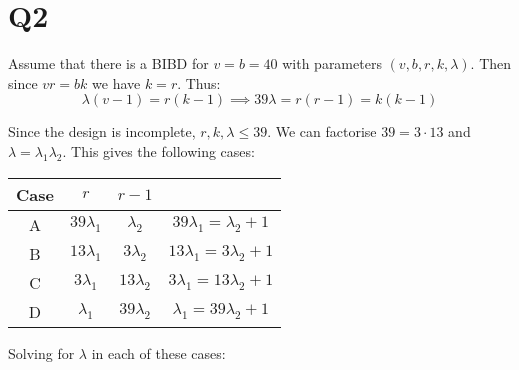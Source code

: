 \documentclass[a4paper, 11pt]{article}
\begin{document}
\pagebreak
\section*{Q2}
 Assume that there is a BIBD for $v=b=40$ with parameters $(v,b,r,k,\lambda)$. Then since $vr=bk$ we have $k=r$. Thus: 
\[
	\lambda(v-1) = r(k-1) \implies 39\lambda = r(r-1) = k(k-1)
\]

Since the design is incomplete, $r,k,\lambda\leq39$. We can factorise $39=3\cdot 13$ and $\lambda=\lambda_1\lambda_2$. This gives the following cases: 

\begin{center}
	\begin{tabular}{c|cc|c}
		Case& $r$           & $r-1$         &                              \\\midrule
		A	& $39\lambda_1$ & $\lambda_2  $ & $39\lambda_1=\lambda_2  +1$  \\
		B	& $13\lambda_1$ & $3\lambda_2 $ & $13\lambda_1=3\lambda_2 +1$  \\
		C	& $3\lambda_1 $ & $13\lambda_2$ & $3\lambda_1 =13\lambda_2+1$  \\
		D	& $\lambda_1  $ & $39\lambda_2$ & $\lambda_1  =39\lambda_2+1$  \\
		\end{tabular}
\end{center}

Solving for $\lambda$ in each of these cases:
\end{document}
